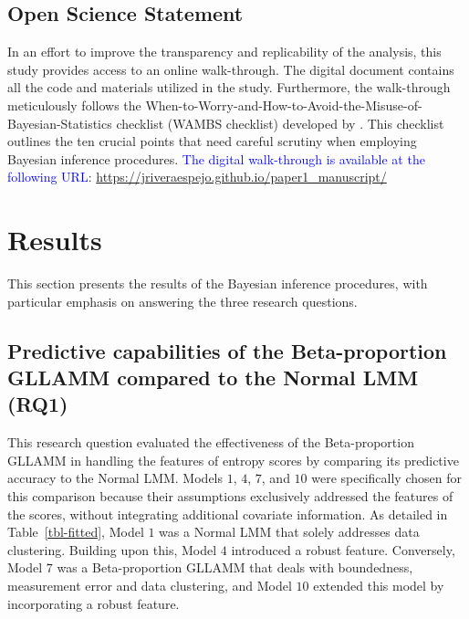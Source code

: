 \documentclass[
  authoryear,
  preprint,
  1p]{elsarticle}
\begin{document}
\subsection{Open Science Statement}\label{sec-M-SM-OS}

In an effort to improve the transparency and replicability of the
analysis, this study provides access to an online walk-through. The
digital document contains all the code and materials utilized in the
study. Furthermore, the walk-through meticulously follows the
When-to-Worry-and-How-to-Avoid-the-Misuse-of-Bayesian-Statistics
checklist (WAMBS checklist) developed by \citet{Depaoli_et_al_2017}.
This checklist outlines the ten crucial points that need careful
scrutiny when employing Bayesian inference procedures. \textcolor{blue}{The digital
walk-through is available at the following URL}:
\url{https://jriveraespejo.github.io/paper1_manuscript/}

\section{Results}\label{sec-results}

This section presents the results of the Bayesian inference procedures,
with particular emphasis on answering the three research questions.

\subsection{Predictive capabilities of the Beta-proportion GLLAMM
compared to the Normal LMM (RQ1)}\label{sec-R-RQ1}

This research question evaluated the effectiveness of the
Beta-proportion GLLAMM in handling the features of entropy scores by
comparing its predictive accuracy to the Normal LMM. Models \(1\),
\(4\), \(7\), and \(10\) were specifically chosen for this comparison
because their assumptions exclusively addressed the features of the
scores, without integrating additional covariate information. As
detailed in Table~\ref{tbl-fitted}, Model \(1\) was a Normal LMM that
solely addresses data clustering. Building upon this, Model \(4\)
introduced a robust feature. Conversely, Model \(7\) was a
Beta-proportion GLLAMM that deals with boundedness, measurement error
and data clustering, and Model \(10\) extended this model by
incorporating a robust feature.
\end{document}
